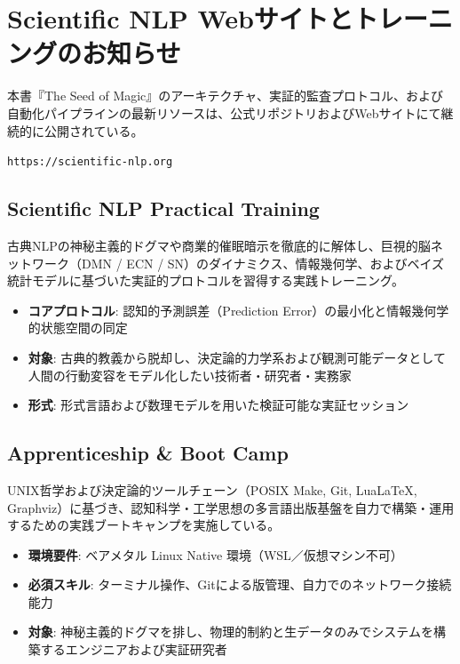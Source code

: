 \ifja
    \chapter*{Scientific NLP Webサイトとトレーニングのお知らせ}

    本書『The Seed of Magic』のアーキテクチャ、実証的監査プロトコル、および自動化パイプラインの最新リソースは、公式リポジトリおよびWebサイトにて継続的に公開されている。

    \begin{center}
        
        \par 
        {\footnotesize\texttt{https://scientific-nlp.org}}
    \end{center}

    \section*{Scientific NLP Practical Training}
    古典NLPの神秘主義的ドグマや商業的催眠暗示を徹底的に解体し、巨視的脳ネットワーク（DMN / ECN / SN）のダイナミクス、情報幾何学、およびベイズ統計モデルに基づいた実証的プロトコルを習得する実践トレーニング。

    \begin{itemize}
        \item \textbf{コアプロトコル}: 認知的予測誤差（Prediction Error）の最小化と情報幾何学的状態空間の同定
        \item \textbf{対象}: 古典的教義から脱却し、決定論的力学系および観測可能データとして人間の行動変容をモデル化したい技術者・研究者・実務家
        \item \textbf{形式}: 形式言語および数理モデルを用いた検証可能な実証セッション
    \end{itemize}

    \section*{Apprenticeship \& Boot Camp}
    UNIX哲学および決定論的ツールチェーン（POSIX Make, Git, Lua\LaTeX, Graphviz）に基づき、認知科学・工学思想の多言語出版基盤を自力で構築・運用するための実践ブートキャンプを実施している。

    \begin{itemize}
        \item \textbf{環境要件}: ベアメタル Linux Native 環境（WSL／仮想マシン不可）
        \item \textbf{必須スキル}: ターミナル操作、Gitによる版管理、自力でのネットワーク接続能力
        \item \textbf{対象}: 神秘主義的ドグマを排し、物理的制約と生データのみでシステムを構築するエンジニアおよび実証研究者
    \end{itemize}

